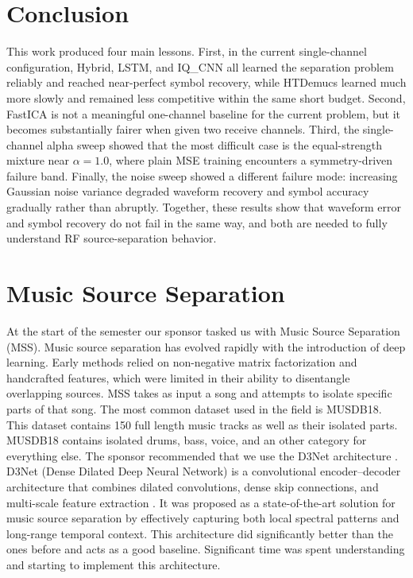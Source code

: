 \documentclass[conference]{IEEEtran}
\begin{document}
\section{Conclusion}
This work produced four main lessons. First, in the current single-channel configuration, Hybrid, LSTM, and IQ\_CNN all learned the separation problem reliably and reached near-perfect symbol recovery, while HTDemucs learned much more slowly and remained less competitive within the same short budget. Second, FastICA is not a meaningful one-channel baseline for the current problem, but it becomes substantially fairer when given two receive channels. Third, the single-channel alpha sweep showed that the most difficult case is the equal-strength mixture near $\alpha=1.0$, where plain MSE training encounters a symmetry-driven failure band. Finally, the noise sweep showed a different failure mode: increasing Gaussian noise variance degraded waveform recovery and symbol accuracy gradually rather than abruptly. Together, these results show that waveform error and symbol recovery do not fail in the same way, and both are needed to fully understand RF source-separation behavior.

\newpage




\appendices

\section{Music Source Separation}
At the start of the semester our sponsor tasked us with Music Source Separation (MSS). Music source separation has evolved rapidly with the introduction of deep learning. Early methods relied on non-negative matrix factorization and handcrafted features, which were limited in their ability to disentangle overlapping sources.
MSS takes as input a song and attempts to isolate specific parts of that song. The most common dataset used in the field is MUSDB18. This dataset contains 150 full length music tracks as well as their isolated parts. MUSDB18 contains isolated drums, bass, voice, and an other category for everything else. The sponsor recommended that we use the D3Net architecture \cite{d3net}. D3Net (Dense Dilated Deep Neural Network) is a convolutional encoder–decoder architecture that combines dilated convolutions, dense skip connections, and multi-scale feature extraction \cite{d3net}. It was proposed as a state-of-the-art solution for music source separation by effectively capturing both local spectral patterns and long-range temporal context. This architecture did significantly better than the ones before and acts as a good baseline. Significant time was spent understanding and starting to implement this architecture.
\end{document}
